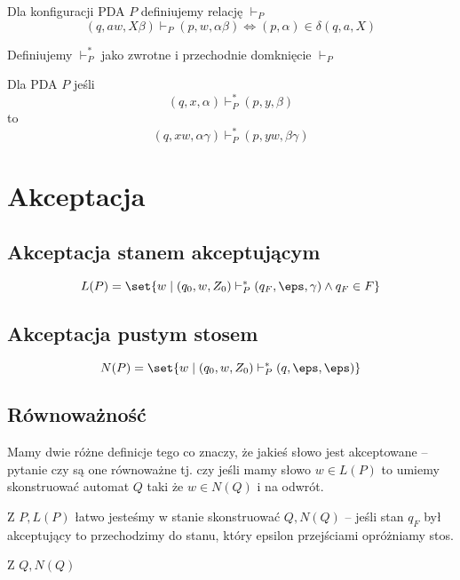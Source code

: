 \begin{definition}
	Dla konfiguracji PDA \( P \) definiujemy relację \( \vdash_P \)
	\[
		(q, aw, X\beta) \vdash_P (p, w, \alpha \beta)
		\iff
		(p, \alpha) \in \delta(q, a, X)
	\]
\end{definition}

\begin{definition}
	Definiujemy \( \vdash_P^* \) jako zwrotne i przechodnie domknięcie \( \vdash_P \)
\end{definition}

\begin{lemma}
	Dla PDA \( P \) jeśli
	\[
		(q, x, \alpha) \vdash_P^* (p, y, \beta)
	\]
	to
	\[
		(q, xw, \alpha\gamma) \vdash_P^* (p, yw, \beta\gamma)
	\]
\end{lemma}

\section{Akceptacja}
\subsection{Akceptacja stanem akceptującym}
\[
	L(P) = \set{ w \mid (q_0, w, Z_0) \vdash_P^* (q_F, \eps, \gamma) \land q_F \in F}
\]

\subsection{Akceptacja pustym stosem}
\[
	N(P) = \set{ w \mid (q_0, w, Z_0) \vdash_P^* (q, \eps, \eps)}
\]

\subsection{Równoważność}
Mamy dwie różne definicje tego co znaczy, że jakieś słowo jest akceptowane -- pytanie czy są one równoważne tj. czy jeśli mamy słowo \( w \in L(P) \) to umiemy skonstruować automat \( Q \) taki że \( w \in N(Q)  \) i na odwrót.

Z \( P, L(P) \) łatwo jesteśmy w stanie skonstruować \( Q, N(Q) \) -- jeśli stan \( q_F \) był akceptujący to przechodzimy do stanu, który epsilon przejściami opróżniamy stos.

Z \( Q, N(Q) \)



